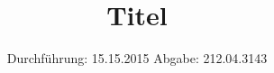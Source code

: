 

\subject{V21}
\title{Titel}
\date{
\centering
  Durchführung: 15.15.2015
  \hspace{3em}
  Abgabe: 212.04.3143
}



\maketitle
\thispagestyle{empty}
\tableofcontents
\newpage



%




\printbibliography


